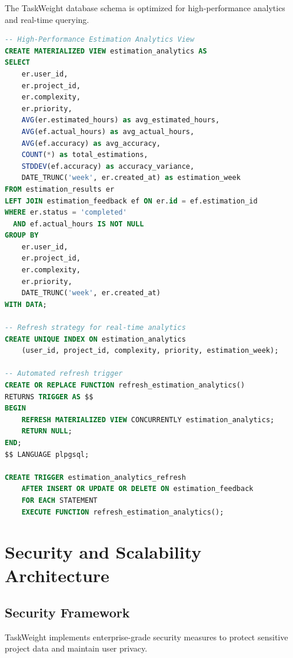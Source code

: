 \documentclass[12pt,a4paper]{article}
\begin{document}
The TaskWeight database schema is optimized for high-performance analytics and real-time querying.

\begin{lstlisting}[language=SQL, caption=Optimized Database Views]
-- High-Performance Estimation Analytics View
CREATE MATERIALIZED VIEW estimation_analytics AS
SELECT 
    er.user_id,
    er.project_id,
    er.complexity,
    er.priority,
    AVG(er.estimated_hours) as avg_estimated_hours,
    AVG(ef.actual_hours) as avg_actual_hours,
    AVG(ef.accuracy) as avg_accuracy,
    COUNT(*) as total_estimations,
    STDDEV(ef.accuracy) as accuracy_variance,
    DATE_TRUNC('week', er.created_at) as estimation_week
FROM estimation_results er
LEFT JOIN estimation_feedback ef ON er.id = ef.estimation_id
WHERE er.status = 'completed'
  AND ef.actual_hours IS NOT NULL
GROUP BY 
    er.user_id, 
    er.project_id, 
    er.complexity, 
    er.priority,
    DATE_TRUNC('week', er.created_at)
WITH DATA;

-- Refresh strategy for real-time analytics
CREATE UNIQUE INDEX ON estimation_analytics 
    (user_id, project_id, complexity, priority, estimation_week);

-- Automated refresh trigger
CREATE OR REPLACE FUNCTION refresh_estimation_analytics()
RETURNS TRIGGER AS $$
BEGIN
    REFRESH MATERIALIZED VIEW CONCURRENTLY estimation_analytics;
    RETURN NULL;
END;
$$ LANGUAGE plpgsql;

CREATE TRIGGER estimation_analytics_refresh
    AFTER INSERT OR UPDATE OR DELETE ON estimation_feedback
    FOR EACH STATEMENT
    EXECUTE FUNCTION refresh_estimation_analytics();
\end{lstlisting}

\section{Security and Scalability Architecture}

\subsection{Security Framework}

TaskWeight implements enterprise-grade security measures to protect sensitive project data and maintain user privacy.
\end{document}
